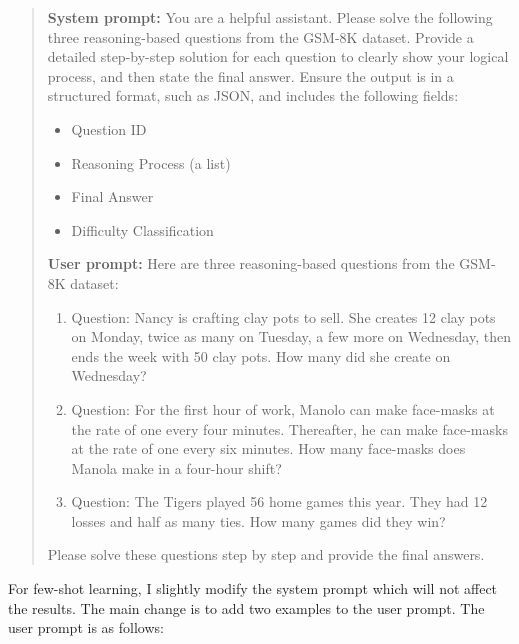 \documentclass[a4paper,12pt]{article}
\begin{document}
\begin{quote}
    \textbf{System prompt:} You are a helpful assistant. Please solve the following three reasoning-based questions from the GSM-8K dataset. Provide a detailed step-by-step solution for each question to clearly show your logical process, and then state the final answer. Ensure the output is in a structured format, such as JSON, and includes the following fields:
        \begin{itemize}
            \item Question ID
            \item Reasoning Process (a list)
            \item Final Answer
            \item Difficulty Classification
        \end{itemize}

        \textbf{User prompt:} Here are three reasoning-based questions from the GSM-8K dataset:  
        \begin{enumerate}
            \item Question: Nancy is crafting clay pots to sell. She creates 12 clay pots on Monday, twice as many on Tuesday, a few more on Wednesday, then ends the week with 50 clay pots. How many did she create on Wednesday?
            \item Question: For the first hour of work, Manolo can make face-masks at the rate of one every four minutes. Thereafter, he can make face-masks at the rate of one every six minutes. How many face-masks does Manola make in a four-hour shift?
            \item Question: The Tigers played 56 home games this year. They had 12 losses and half as many ties. How many games did they win?
        \end{enumerate}
        Please solve these questions step by step and provide the final answers.

\end{quote}

For few-shot learning, I slightly modify the system prompt which will not affect the results. The main change is to add two examples to the user prompt. The user prompt is as follows:
\end{document}
